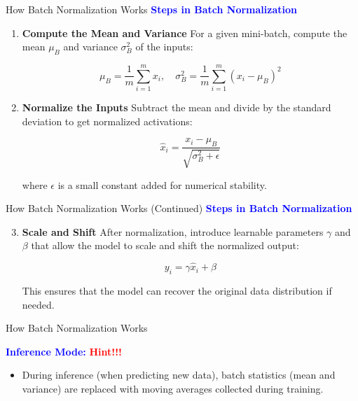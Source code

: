 \documentclass[serif, aspectratio=169]{beamer}
\begin{document}
\begin{frame}{How Batch Normalization Works}
    \textcolor{blue}{\textbf{Steps in Batch Normalization}}
    
    \begin{enumerate}[<+-| alert@+>] %
        \item \textbf{Compute the Mean and Variance} 
              \newline
              For a given mini-batch, compute the mean $\mu_B$ and variance $\sigma_B^2$ of the inputs:
    
              \[
               \mu_B = \frac{1}{m} \sum_{i=1}^{m} x_i, \quad \sigma_B^2 = \frac{1}{m} \sum_{i=1}^{m} (x_i - \mu_B)^2
              \]
        \item \textbf{Normalize the Inputs}
        \newline
        Subtract the mean and divide by the standard deviation to get normalized activations:

        \[
        \hat{x}_i = \frac{x_i - \mu_B}{\sqrt{\sigma_B^2 + \epsilon}}
        \]

        where $\epsilon$ is a small constant added for numerical stability.
    \end{enumerate}
\end{frame}

\begin{frame}{How Batch Normalization Works (Continued)}
    \textcolor{blue}{\textbf{Steps in Batch Normalization}}
    
    \begin{enumerate}[<+-| alert@+>] %
        \setcounter{enumi}{2} %
        \item \textbf{Scale and Shift}
        \newline
        After normalization, introduce learnable parameters $\gamma$ and $\beta$ that allow the model to scale and shift the normalized output:
    
        \[
            y_i = \gamma \hat{x}_i + \beta
        \]

        This ensures that the model can recover the original data distribution if needed.
    \end{enumerate}
\end{frame}

\begin{frame}{How Batch Normalization Works}

    \textcolor{blue}{\textbf{Inference Mode:}} {\textbf{\textcolor{red}{Hint!!!}}}
    
    \begin{itemize}

        \item During inference (when predicting new data), batch statistics (mean and variance) are replaced with moving averages collected during training.

    \end{itemize}
\end{frame}
\end{document}
